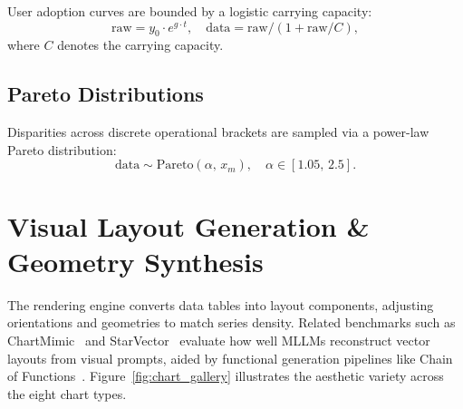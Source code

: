 \documentclass[11pt,twocolumn]{article}
\begin{document}
User adoption curves are bounded by a logistic carrying capacity:
\begin{equation}\label{eq:satgrowth}
  \text{raw} = y_0 \cdot e^{g \cdot t}, \quad \text{data} = \text{raw} / (1 + \text{raw}/C),
\end{equation}
where $C$ denotes the carrying capacity.

\subsection{Pareto Distributions}\label{sec:pareto}

Disparities across discrete operational brackets are sampled via a power-law Pareto distribution:
\begin{equation}\label{eq:pareto}
  \text{data} \sim \text{Pareto}(\alpha,\, x_m), \quad \alpha \in [1.05,\, 2.5].
\end{equation}

\section{Visual Layout Generation \& Geometry Synthesis}\label{sec:layout}

The rendering engine converts data tables into layout components, adjusting orientations and geometries to match series density.
Related benchmarks such as ChartMimic~\cite{yang2025chartmimic} and StarVector~\cite{rodriguez2025starvector} evaluate how well MLLMs reconstruct vector layouts from visual prompts, aided by functional generation pipelines like Chain of Functions~\cite{wang2025chainoffunctions}.
Figure~\ref{fig:chart_gallery} illustrates the aesthetic variety across the eight chart types.
\end{document}
